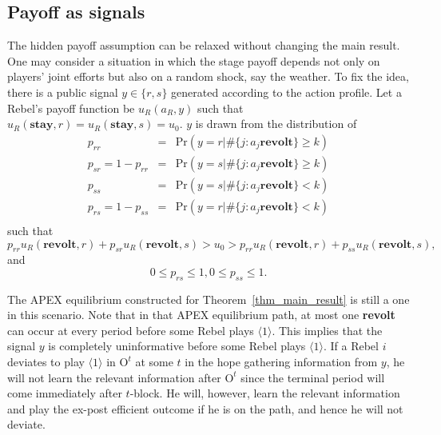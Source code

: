 \documentclass[12pt,letter]{article}
\newcommand{\Omicron}{\mathrm{O}}
\theoremstyle{definition}
\theoremstyle{remark}
\theoremstyle{claim}
\begin{document}
\subsection{Payoff as signals}
The hidden payoff assumption can be relaxed without changing the main result. One may consider a situation in which the stage payoff depends not only on players' joint efforts but also on a random shock, say the weather. To fix the idea, there is a public signal $y\in \{r,s\}$ generated according to the action profile. Let a Rebel's payoff function be $u_{R}(a_{R},y)$ such that $u_{R}(\textbf{stay},r)=u_{R}(\textbf{stay},s)=u_0$. $y$ is drawn from the distribution of 
\begin{eqnarray*}
p_{rr} &=& \mathrm {Pr}(y=r|\#\{j:a_j\textbf{revolt}\}\geq k) \\
p_{sr}=1-p_{rr} &=& \mathrm {Pr}(y=s|\#\{j:a_j\textbf{revolt}\}\geq k) \\
p_{ss} &=& \mathrm {Pr}(y=s|\#\{j:a_j\textbf{revolt}\}< k) \\
p_{rs}=1-p_{ss} &=& \mathrm {Pr}(y=r|\#\{j:a_j\textbf{revolt}\}< k) \\
\end{eqnarray*}
such that
\begin{equation*}
p_{rr}u_{R}(\textbf{revolt}, r)+p_{sr}u_{R}(\textbf{revolt}, s)>u_0>p_{rr}u_{R}(\textbf{revolt}, r)+p_{ss}u_{R}(\textbf{revolt}, s),
\end{equation*}
and
\begin{equation*}
0\leq p_{rs}\leq 1,0\leq p_{ss}\leq 1.
\end{equation*}

The APEX equilibrium constructed for Theorem~\ref{thm_main_result} is still a one in this scenario. Note that in that APEX equilibrium path, at most one \textbf{revolt} can occur at every period before some Rebel plays $\langle 1 \rangle$. This implies that the signal $y$ is completely uninformative before some Rebel plays $\langle 1 \rangle$. If a Rebel $i$ deviates to play $\langle 1 \rangle$ in $\Omicron^t$ at some $t$ in the hope gathering information from $y$, he will not learn the relevant information after $\Omicron^t$ since the terminal period will come immediately after $t$-block. He will, however, learn the relevant information and play the ex-post efficient outcome if he is on the path, and hence he will not deviate.

\end{document}
